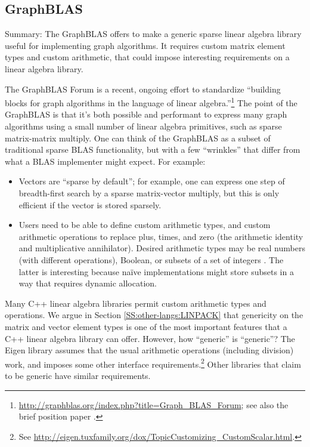 \subsection{GraphBLAS}
\label{SS:other-standards:GraphBLAS}

Summary: The GraphBLAS offers to make a generic sparse linear algebra
library useful for implementing graph algorithms.  It requires custom
matrix element types and custom arithmetic, that could impose
interesting requirements on a linear algebra library.

The GraphBLAS Forum is a recent, ongoing effort to standardize
``building blocks for graph algorithms in the language of linear
algebra.''\footnote{\url{http://graphblas.org/index.php?title=Graph_BLAS_Forum};
  see also the brief position paper \cite{mattson2013standards}.}  The
point of the GraphBLAS is that it's both possible and performant to
express many graph algorithms using a small number of linear algebra
primitives, such as sparse matrix-matrix multiply.  One can think of
the GraphBLAS as a subset of traditional sparse BLAS functionality,
but with a few ``wrinkles'' that differ from what a BLAS implementer
might expect.  For example:
\begin{itemize}
\item Vectors are ``sparse by default''; for example, one can express
  one step of breadth-first search by a sparse matrix-vector multiply,
  but this is only efficient if the vector is stored sparsely.
\item Users need to be able to define custom arithmetic types, and
  custom arithmetic operations to replace plus, times, and zero (the
  arithmetic identity and multiplicative annihilator).  Desired
  arithmetic types may be real numbers (with different operations),
  Boolean, or subsets of a set of integers \cite{kepner2016math}.  The
  latter is interesting because na\"ive implementations might store
  subsets in a way that requires dynamic allocation.
\end{itemize}

Many C++ linear algebra libraries permit custom arithmetic types and
operations.  We argue in Section \ref{SS:other-langs:LINPACK} that
genericity on the matrix and vector element types is one of the most
important features that a C++ linear algebra library can offer.
However, how ``generic'' is ``generic''?  The Eigen library assumes
that the usual arithmetic operations (including division) work, and
imposes some other interface requirements.\footnote{See
  \url{http://eigen.tuxfamily.org/dox/TopicCustomizing_CustomScalar.html}.}
Other libraries that claim to be generic have similar requirements.

